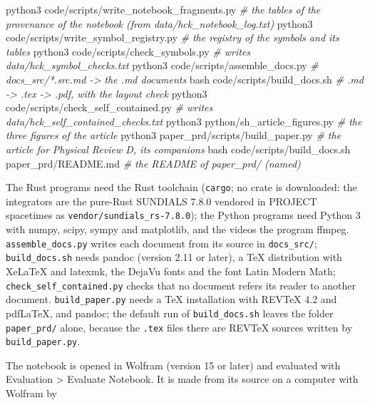 \documentclass[
  10pt,
]{article}
\newenvironment{Shaded}{}{}
\newcommand{\CommentTok}[1]{\textcolor[rgb]{0.38,0.63,0.69}{\textit{#1}}}
\newcommand{\ExtensionTok}[1]{#1}
\newcommand{\FunctionTok}[1]{\textcolor[rgb]{0.02,0.16,0.49}{#1}}
\newcommand{\NormalTok}[1]{#1}
\begin{document}
\begin{Shaded}
\begin{Highlighting}[]
\ExtensionTok{python3}\NormalTok{ code/scripts/write\_notebook\_fragments.py }\CommentTok{\# the tables of the provenance of the notebook (from data/hck\_notebook\_log.txt)}
\ExtensionTok{python3}\NormalTok{ code/scripts/write\_symbol\_registry.py }\CommentTok{\# the registry of the symbols and its tables}
\ExtensionTok{python3}\NormalTok{ code/scripts/check\_symbols.py         }\CommentTok{\# writes data/hck\_symbol\_checks.txt}
\ExtensionTok{python3}\NormalTok{ code/scripts/assemble\_docs.py         }\CommentTok{\# docs\_src/*.src.md {-}\textgreater{} the .md documents}
\FunctionTok{bash}\NormalTok{ code/scripts/build\_docs.sh               }\CommentTok{\# .md {-}\textgreater{} .tex {-}\textgreater{} .pdf, with the layout check}
\ExtensionTok{python3}\NormalTok{ code/scripts/check\_self\_contained.py  }\CommentTok{\# writes data/hck\_self\_contained\_checks.txt}
\ExtensionTok{python3}\NormalTok{ python/sh\_article\_figures.py          }\CommentTok{\# the three figures of the article}
\ExtensionTok{python3}\NormalTok{ paper\_prd/scripts/build\_paper.py      }\CommentTok{\# the article for Physical Review D, its companions}
\FunctionTok{bash}\NormalTok{ code/scripts/build\_docs.sh paper\_prd/README.md  }\CommentTok{\# the README of paper\_prd/ (named)}
\end{Highlighting}
\end{Shaded}

The Rust programs need the Rust toolchain (\texttt{cargo}; no crate is
downloaded: the integrators are the pure-Rust SUNDIALS 7.8.0 vendored in
PROJECT spacetimes as \texttt{vendor/sundials\_rs-7.8.0}); the Python
programs need Python 3 with numpy, scipy, sympy and matplotlib, and the
videos the program ffmpeg. \texttt{assemble\_docs.py} writes each
document from its source in \texttt{docs\_src/}; \texttt{build\_docs.sh}
needs pandoc (version 2.11 or later), a TeX distribution with XeLaTeX
and latexmk, the DejaVu fonts and the font Latin Modern Math;
\texttt{check\_self\_contained.py} checks that no document refers its
reader to another document. \texttt{build\_paper.py} needs a TeX
installation with REVTeX 4.2 and pdfLaTeX, and pandoc; the default run
of \texttt{build\_docs.sh} leaves the folder \texttt{paper\_prd/} alone,
because the \texttt{.tex} files there are REVTeX sources written by
\texttt{build\_paper.py}.

The notebook is opened in Wolfram (version 15 or later) and evaluated
with Evaluation \textgreater{} Evaluate Notebook. It is made from its
source on a computer with Wolfram by
\end{document}
